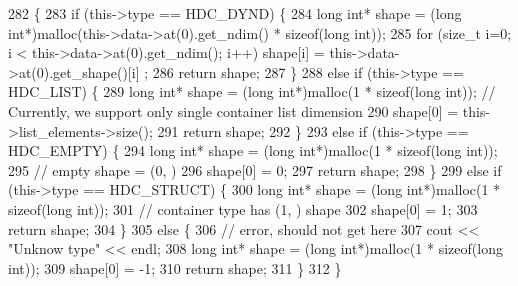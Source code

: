 \begin{DoxyCode}
282 \{
283     \textcolor{keywordflow}{if} (this->type == HDC\_DYND) \{
284         \textcolor{keywordtype}{long} \textcolor{keywordtype}{int}* shape = (\textcolor{keywordtype}{long} \textcolor{keywordtype}{int}*)malloc(this->data->at(0).get\_ndim() * \textcolor{keyword}{sizeof}(\textcolor{keywordtype}{long} int));
285         \textcolor{keywordflow}{for} (\textcolor{keywordtype}{size\_t} i=0; i < this->data->at(0).get\_ndim(); i++) shape[i] = this->data->at(0).get\_shape()[i]
      ;
286         \textcolor{keywordflow}{return} shape;
287     \}
288     \textcolor{keywordflow}{else} \textcolor{keywordflow}{if} (this->type == HDC\_LIST) \{
289         \textcolor{keywordtype}{long} \textcolor{keywordtype}{int}* shape = (\textcolor{keywordtype}{long} \textcolor{keywordtype}{int}*)malloc(1 * \textcolor{keyword}{sizeof}(\textcolor{keywordtype}{long} \textcolor{keywordtype}{int})); \textcolor{comment}{// Currently, we support only single
       container list dimension}
290         shape[0] = this->list\_elements->size();
291         \textcolor{keywordflow}{return} shape;
292     \}
293     \textcolor{keywordflow}{else} \textcolor{keywordflow}{if} (this->type == HDC\_EMPTY) \{
294         \textcolor{keywordtype}{long} \textcolor{keywordtype}{int}* shape = (\textcolor{keywordtype}{long} \textcolor{keywordtype}{int}*)malloc(1 * \textcolor{keyword}{sizeof}(\textcolor{keywordtype}{long} \textcolor{keywordtype}{int})); 
295         \textcolor{comment}{// empty shape = (0, )}
296         shape[0] = 0;
297         \textcolor{keywordflow}{return} shape;
298     \}
299     \textcolor{keywordflow}{else} \textcolor{keywordflow}{if} (this->type == HDC\_STRUCT) \{
300         \textcolor{keywordtype}{long} \textcolor{keywordtype}{int}* shape = (\textcolor{keywordtype}{long} \textcolor{keywordtype}{int}*)malloc(1 * \textcolor{keyword}{sizeof}(\textcolor{keywordtype}{long} \textcolor{keywordtype}{int})); 
301         \textcolor{comment}{// container type has (1, ) shape}
302         shape[0] = 1;
303         \textcolor{keywordflow}{return} shape;
304     \}
305     \textcolor{keywordflow}{else} \{
306         \textcolor{comment}{// error, should not get here}
307         cout << \textcolor{stringliteral}{"Unknow type"} << endl;
308         \textcolor{keywordtype}{long} \textcolor{keywordtype}{int}* shape = (\textcolor{keywordtype}{long} \textcolor{keywordtype}{int}*)malloc(1 * \textcolor{keyword}{sizeof}(\textcolor{keywordtype}{long} \textcolor{keywordtype}{int})); 
309         shape[0] = -1;
310         \textcolor{keywordflow}{return} shape;
311     \}
312 \}
\end{DoxyCode}
